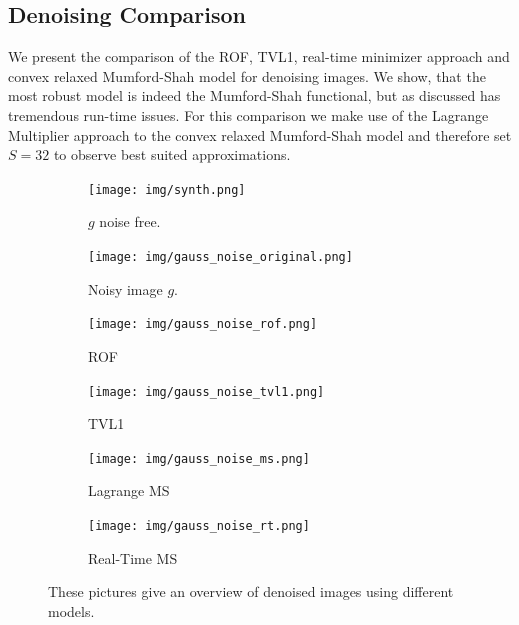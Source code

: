 \documentclass{scrreprt}
\begin{document}

        \subsection{Denoising Comparison} %
        \label{sub:denoising_comparison}

            We present the comparison of the ROF, TVL1, real-time minimizer approach and convex relaxed Mumford-Shah model for denoising images. We show, that the most robust model is indeed the Mumford-Shah functional, but as discussed has tremendous run-time issues. For this comparison we make use of the Lagrange Multiplier approach to the convex relaxed Mumford-Shah model and therefore set $S = 32$ to observe best suited approximations.

            \begin{figure}[!ht]
                \centering
                \begin{subfigure}[b]{0.32\textwidth}
                    \texttt{[image: img/synth.png]}
                    \caption{$g$ noise free.}
                \end{subfigure}
                \begin{subfigure}[b]{0.32\textwidth}
                    \texttt{[image: img/gauss\_noise\_original.png]}
                    \caption{Noisy image $g$.}
                \end{subfigure}
                \begin{subfigure}[b]{0.32\textwidth}
                    \texttt{[image: img/gauss\_noise\_rof.png]}
                    \caption{ROF}
                \end{subfigure}
                \begin{subfigure}[b]{0.32\textwidth}
                    \texttt{[image: img/gauss\_noise\_tvl1.png]}
                    \caption{TVL1}
                \end{subfigure}
                \begin{subfigure}[b]{0.32\textwidth}
                    \texttt{[image: img/gauss\_noise\_ms.png]}
                    \caption{Lagrange MS}
                \end{subfigure}
                \begin{subfigure}[b]{0.32\textwidth}
                    \texttt{[image: img/gauss\_noise\_rt.png]}
                    \caption{Real-Time MS}
                \end{subfigure}
                \caption[Removing Gaussion noise: comparison of several models.]{These pictures give an overview of denoised images using different models.}
            \label{fig:synth_gauss_compare}
            \end{figure}
\end{document}
